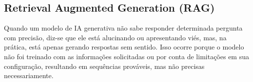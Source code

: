 \documentclass[a4paper, 12pt]{article}
\newcommand{\citeb}[1]{\bibleftbracket\cite{#1}\bibrightbracket}
\begin{document}



    \subsection{Retrieval Augmented Generation (RAG)}
    
    Quando um modelo de IA generativa não sabe responder determinada pergunta com precisão, diz-se que ele está alucinando ou apresentando viés, mas, na prática, está apenas gerando respostas sem sentido. Isso ocorre porque o modelo não foi treinado com as informações solicitadas ou por conta de limitações em sua configuração, resultando em sequências prováveis, mas não precisas necessariamente.

\end{document}
